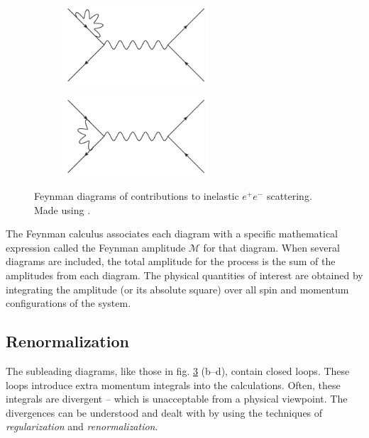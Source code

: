 \begin{figure}[htbp]
	\begin{subfigure}[b]{0.45\textwidth}
		\centering
		\includegraphics[width=0.6\textwidth]{figures/susyintro/epscattering_fermioncorr.pdf}
		\caption{ }
		\label{fig:feynmandiagram_c}
	\end{subfigure}
	\begin{subfigure}[b]{0.45\textwidth}
		\centering
		\includegraphics[width=0.6\textwidth]{figures/susyintro/epscattering_vertexcorr.pdf}
		\caption{ }
		\label{fig:feynmandiagram_d}
	\end{subfigure}
	\caption{Feynman diagrams of contributions to inelastic $e^+ e^-$ scattering. Made using \cite{Binosi:2003yf}.}
	\label{fig:feynmandiagram}
\end{figure}
The Feynman calculus associates each diagram with a specific mathematical expression called the Feynman amplitude $\mathcal{M}$ for that diagram. When several diagrams are included, the total amplitude for the process is the sum of the amplitudes from each diagram. The physical quantities of interest are obtained by integrating the amplitude (or its absolute square) over all spin and momentum configurations of the system.

\subsection{Renormalization}
The subleading diagrams, like those in fig.  \ref{fig:feynmandiagram} (b--d), contain closed loops. These loops introduce extra momentum integrals into the calculations. Often, these integrals are divergent -- which is unacceptable from a physical viewpoint. The divergences can be understood and dealt with by using the techniques of {\it regularization} and {\it renormalization}. 
